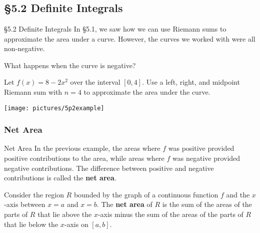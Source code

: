 \documentclass[cal1spr16Lectures.tex]{subfiles}
\begin{document}
\section[]{}

\subsection[5.2 Definite Integrals]{\S 5.2 Definite Integrals}

\begin{frame}{\S 5.2 Definite Integrals}\small
In \S 5.1, we saw how we can use Riemann sums to approximate the area under a curve.  However, the curves we worked with were all non-negative.
\begin{que} 
What happens when the curve is negative?
\end{que}
\end{frame}

\begin{frame}
\begin{ex} 
Let $f(x)=8-2x^2$ over the interval $[0,4]$.  Use a left, right, and midpoint Riemann sum with $n=4$ to approximate the area under the curve.

\begin{center}
\texttt{[image: pictures/5p2example]}
\end{center} 
\end{ex}
\end{frame}

\subsubsection{Net Area}

\begin{frame}{\small Net Area}\footnotesize
In the previous example, the areas where $f$ was positive provided positive contributions to the area, while areas where $f$ was negative provided negative contributions.  The difference between positive and negative contributions is called the {\bf net area}.
\begin{dfn} 
Consider the region $R$ bounded by the graph of a continuous function $f$ and the $x$-axis between $x=a$ and $x=b$.  The {\bf net area} of $R$ is the sum of the areas of the parts of $R$ that lie above the $x$-axis minus the sum of the areas of the parts of $R$ that lie below the $x$-axis on $[a,b]$. 
\end{dfn}
\end{frame}
\end{document}
